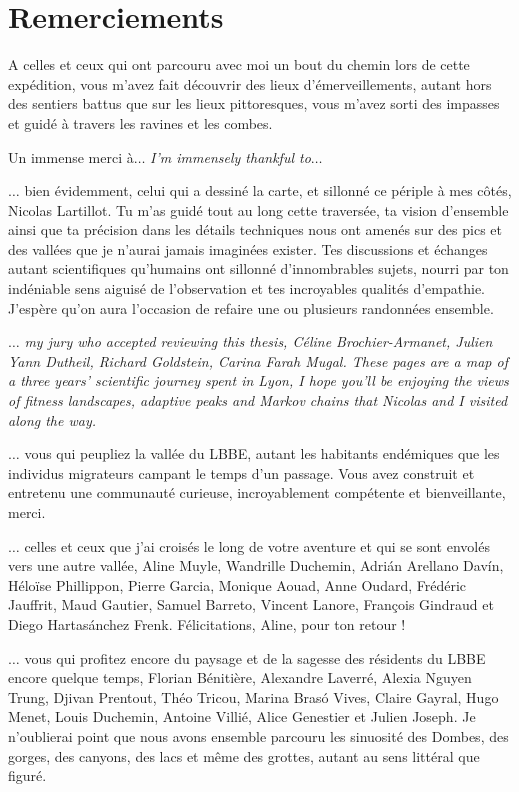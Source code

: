 \thispagestyle{empty}
\section*{Remerciements}


A celles et ceux qui ont parcouru avec moi un bout du chemin lors de cette expédition, vous m’avez fait découvrir des lieux d’émerveillements, autant hors des sentiers battus que sur les lieux pittoresques, vous m’avez sorti des impasses et guidé à travers les ravines et les combes.

Un immense merci à$\hdots$ \textit{I’m immensely thankful to$\hdots$}

$\hdots$ bien évidemment, celui qui a dessiné la carte, et sillonné ce périple à mes côtés, Nicolas Lartillot.
Tu m’as guidé tout au long cette traversée, ta vision d’ensemble ainsi que ta précision dans les détails techniques nous ont amenés sur des pics et des vallées que je n’aurai jamais imaginées exister.
Tes discussions et échanges autant scientifiques qu’humains ont sillonné d'innombrables sujets, nourri par ton indéniable sens aiguisé de l’observation et tes incroyables qualités d’empathie.
J’espère qu’on aura l’occasion de refaire une ou plusieurs randonnées ensemble.

$\hdots$ \textit{my jury who accepted reviewing this thesis, Céline Brochier-Armanet, Julien Yann Dutheil, Richard Goldstein, Carina Farah Mugal.
These pages are a map of a three years’ scientific journey spent in Lyon, I hope you’ll be enjoying the views of fitness landscapes, adaptive peaks and Markov chains that Nicolas and I visited along the way.}

$\hdots$ vous qui peupliez la vallée du LBBE, autant les habitants endémiques que les individus migrateurs campant le temps d’un passage.
Vous avez construit et entretenu une communauté curieuse, incroyablement compétente et bienveillante, merci.

$\hdots$ celles et ceux que j’ai croisés le long de votre aventure et qui se sont envolés vers une autre vallée, Aline Muyle, Wandrille Duchemin, Adrián Arellano Davín, Héloïse Phillippon, Pierre Garcia, Monique Aouad, Anne Oudard, Frédéric Jauffrit, Maud Gautier, Samuel Barreto, Vincent Lanore, François Gindraud et Diego Hartasánchez Frenk.
Félicitations, Aline, pour ton retour !

$\hdots$ vous qui profitez encore du paysage et de la sagesse des résidents du LBBE encore quelque temps, Florian Bénitière, Alexandre Laverré, Alexia Nguyen Trung, Djivan Prentout, Théo Tricou, Marina Brasó Vives, Claire Gayral, Hugo Menet, Louis Duchemin, Antoine Villié, Alice Genestier et Julien Joseph.
Je n’oublierai point que nous avons ensemble parcouru les sinuosité des Dombes, des gorges, des canyons, des lacs et même des grottes, autant au sens littéral que figuré.

